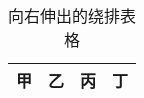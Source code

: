 \begin{wraptable}[4]{r}[1.5cm]{4.5cm}
  \centering
  \caption{向右伸出的绕排表格}\label{tag:wraptable}
  \begin{tabular}{|c|c|c|c|}
    \hline 甲 & 乙 & 丙 & 丁 \\ \hline
  \end{tabular}
\end{wraptable}
